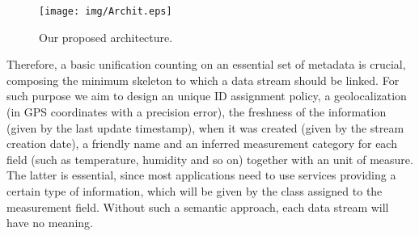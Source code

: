 \begin{figure}[!t]
\centering
\texttt{[image: img/Archit.eps]} 
\caption{Our proposed architecture.}
\label{arch}
\end{figure}

Therefore, a basic unification counting on an essential set of metadata is crucial, composing the minimum skeleton to which a data stream should be linked.
For such purpose we aim to design an unique ID assignment policy, a geolocalization (in GPS coordinates with a precision error), the freshness of the information (given by the last update timestamp), when it was created (given by the stream creation date), a friendly name and an inferred measurement category for each field (such as temperature, humidity and so on) together with an unit of measure.
The latter is essential, since most applications need to use services providing a certain type of information, which will be given by the class assigned to the measurement field.
Without such a semantic approach, each data stream will have no meaning.


